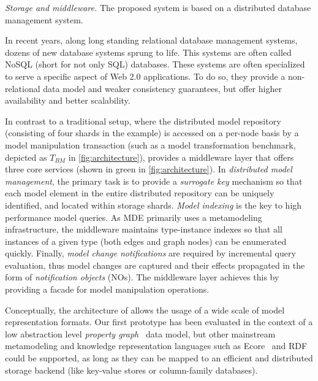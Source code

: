 \emph{Storage and middleware.}\label{storage_and_middleware}
The proposed system is based on a distributed database management system.

In recent years, along long standing relational database management systems, dozens of new database systems sprung to life. This systems are often called NoSQL (short for not only SQL) databases.
These systems are often specialized to serve a specific aspect of Web 2.0 applications. To do so, they provide a non-relational data model and weaker consistency guarantees, but offer higher availability and better scalability.

In contrast to a traditional setup, where the distributed model repository (consisting of four shards in the example) is accessed on a per-node basis by a model manipulation transaction (such as a model transformation benchmark, depicted as $T_{BM}$ in \autoref{fig:architecture}), \incqueryD{} provides a middleware layer that offers three core services (shown in green in \autoref{fig:architecture}).
In {{\em distributed model management}}, the primary task is to provide a \emph{surrogate key} mechanism so that each model element in the entire distributed repository can be uniquely identified, and located within storage shards.
{{\em Model indexing}} is the key to high performance model queries. As MDE primarily uses a metamodeling infrastructure, the \incqueryD{} middleware maintains type-instance indexes so that all instances of a given type (both edges and graph nodes) can be enumerated quickly.
Finally, {{\em model change notifications}} are required by incremental query evaluation, thus model changes are captured and their effects propagated in the form of \emph{notification objects} (NOs). The middleware layer achieves this by providing a facade for model manipulation operations. 

Conceptually, the architecture of \incqueryD{} allows the usage of a wide scale of model representation formats. Our first prototype has been evaluated in the context of a low abstraction level \emph{property graph}~\cite{DBLP:journals/corr/abs-1006-2361} data model, but other mainstream metamodeling and knowledge representation languages such as Ecore~\cite{EMF} and RDF~\cite{website:rdf_standard} could be supported, as long as they can be mapped to an efficient and distributed storage backend (like key-value stores or column-family databases).



